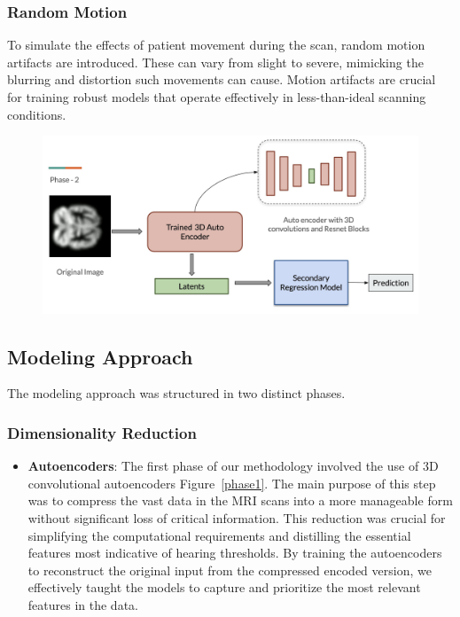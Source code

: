 \documentclass[conference,compsoc]{IEEEtran}
\begin{document}
\subsubsection{Random Motion} To simulate the effects of patient movement during the scan, random motion artifacts are introduced. These can vary from slight to severe, mimicking the blurring and distortion such movements can cause. Motion artifacts are crucial for training robust models that operate effectively in less-than-ideal scanning conditions.


\begin{figure}[htbp]
	\centering
	\includegraphics[width=\textwidth]{Phase2.jpeg}
	\caption{}
	\label{phase2}
\end{figure}

\subsection{Modeling Approach} The modeling approach was structured in two distinct phases.

\subsubsection{Dimensionality Reduction}

\begin{itemize}
	\item {\textbf{Autoencoders}}: The first phase of our methodology involved the use of 3D convolutional autoencoders Figure~\ref{phase1}. The main purpose of this step was to compress the vast data in the MRI scans into a more manageable form without significant loss of critical information. This reduction was crucial for simplifying the computational requirements and distilling the essential features most indicative of hearing thresholds. By training the autoencoders to reconstruct the original input from the compressed encoded version, we effectively taught the models to capture and prioritize the most relevant features in the data.
\end{itemize}
\end{document}
